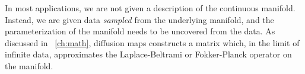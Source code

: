 In most applications, we are not given a description of the continuous manifold.
%
Instead, we are given data {\em sampled} from the underlying manifold, and the parameterization of the manifold needs to be uncovered from the data.
%
As discussed in \chap~\ref{ch:math}, diffusion maps constructs a matrix which, in the limit of infinite data, approximates the Laplace-Beltrami or Fokker-Planck operator on the manifold.
%
%
%
